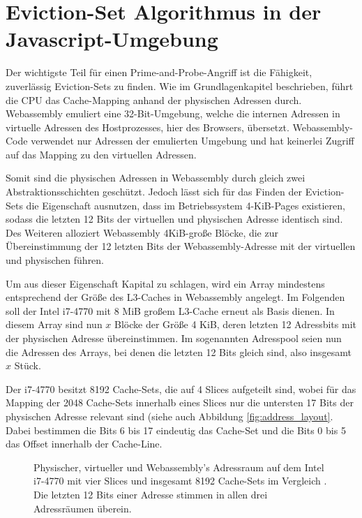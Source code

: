 \section{Eviction-Set Algorithmus in der Javascript-Umgebung}
Der wichtigste Teil für einen Prime-and-Probe-Angriff ist die Fähigkeit, zuverlässig Eviction-Sets zu finden. Wie im Grundlagenkapitel beschrieben, führt die CPU das Cache-Mapping anhand der physischen Adressen durch. Webassembly emuliert eine 32-Bit-Umgebung, welche die internen Adressen in virtuelle Adressen des Hostprozesses, hier des Browsers, übersetzt. 
Webassembly-Code verwendet nur Adressen der emulierten Umgebung und hat keinerlei Zugriff auf das Mapping zu den virtuellen Adressen. 

Somit sind die physischen Adressen in Webassembly durch gleich zwei Abstraktionsschichten geschützt. 
Jedoch lässt sich für das Finden der Eviction-Sets die Eigenschaft ausnutzen, dass im Betriebssystem 4-KiB-Pages existieren, sodass die letzten 12 Bits der virtuellen und physischen Adresse identisch sind. 
Des Weiteren alloziert %
Webassembly 4KiB-große Blöcke, die zur Übereinstimmung der 12 letzten Bits der Webassembly-Adresse mit der virtuellen und physischen führen.

Um aus dieser Eigenschaft Kapital zu schlagen, wird ein Array mindestens entsprechend der Größe des L3-Caches in Webassembly angelegt. Im Folgenden soll der Intel i7-4770 mit 8 MiB großem L3-Cache erneut als Basis dienen. In diesem Array sind nun $x$ Blöcke der Größe 4 KiB, deren letzten 12 Adressbits mit der physischen Adresse übereinstimmen. Im sogenannten Adresspool seien nun die Adressen des Arrays, bei denen die letzten 12 Bits gleich sind, also insgesamt $x$ Stück.

Der i7-4770 besitzt 8192 Cache-Sets, die auf 4 Slices aufgeteilt sind, wobei für das Mapping der 2048 Cache-Sets innerhalb eines Slices nur die untersten 17 Bits der physischen Adresse relevant sind (siehe auch Abbildung \ref{fig:address_layout}. Dabei bestimmen die Bits 6 bis 17 eindeutig das Cache-Set und die Bits 0 bis 5 das Offset innerhalb der Cache-Line.

\label{fig:address_layout}
\begin{figure}[h]
\centering
\begin{scaletikzpicturetowidth}{\textwidth}

\end{scaletikzpicturetowidth}
\caption{Physischer, virtueller und Webassembly's Adressraum auf dem Intel i7-4770 mit vier Slices und insgesamt 8192 Cache-Sets im Vergleich \cite{DriveByPaper}. Die letzten 12 Bits einer Adresse stimmen in allen drei Adressräumen überein.}
\end{figure}

